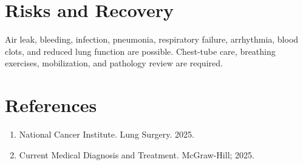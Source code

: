 \section*{Risks and Recovery}
Air leak, bleeding, infection, pneumonia, respiratory failure, arrhythmia, blood clots, and reduced lung function are possible. Chest-tube care, breathing exercises, mobilization, and pathology review are required.
\section*{References}
\begin{enumerate}\item National Cancer Institute. Lung Surgery. 2025.\item Current Medical Diagnosis and Treatment. McGraw-Hill; 2025.\end{enumerate}
\clearpage
